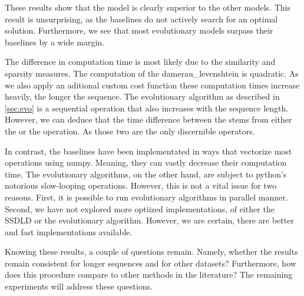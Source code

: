 \documentclass[./../../paper.tex]{subfiles}
\begin{document}
These results show that the model  is clearly superior to the other models. This result is unsurprising, as the baselines do not actively search for an optimal solution. Furthermore, we see that most evolutionary models surpass their baselines by a wide margin. 

The difference in computation time is most likely due to the similarity and sparsity measures. The computation of the \gls{damerau_levenshtein} is quadratic. As we also apply an aditional custom cost function these computation times increase heavily, the longer the sequence. The evolutionary algorithm as described in \autoref{sec:evo} is a sequential operation that also increases with the sequence length. However, we can deduce that the time difference between the  stems from either the  or the  operation. As those two are the only discernible operators. 

In contrast, the baselines have been implementated in ways that vectorize most operations using numpy. Meaning, they can vastly decrease their computation time. The evolutionary algorithms, on the other hand, are subject to python's notorious slow-looping operations. However, this is not a vital issue for two reasons. First, it is possible to run evolutionary algorithms in parallel manner. Second, we have not explored more optiized implementations, of either the \gls{SSDLD} or the evolutionary algorithm. However, we are certain, there are better and fast implementations available. 

Knowing these results, a couple of questions remain. Namely, whether the results remain consistent for longer sequences and for other datasets? Furthermore, how does this procedure compare to other methods in the literature? The remaining experiments will address these questions. 
\end{document}
